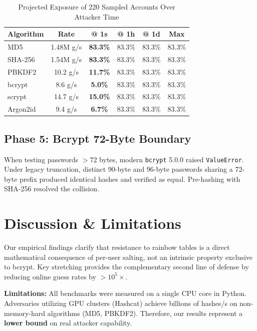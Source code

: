 \documentclass[conference]{IEEEtran}
\begin{document}
\begin{table}[htbp]
\caption{Projected Exposure of 220 Sampled Accounts Over Attacker Time}
\begin{center}
\begin{tabular}{lccccc}
\toprule
\textbf{Algorithm} & \textbf{Rate} & \textbf{@ 1s} & \textbf{@ 1h} & \textbf{@ 1d} & \textbf{Max} \\
\midrule
MD5 & 1.48M g/s & \textbf{83.3\%} & 83.3\% & 83.3\% & 83.3\% \\
SHA-256 & 1.54M g/s & \textbf{83.3\%} & 83.3\% & 83.3\% & 83.3\% \\
PBKDF2 & 10.2 g/s & \textbf{11.7\%} & 83.3\% & 83.3\% & 83.3\% \\
bcrypt & 8.6 g/s & \textbf{5.0\%} & 83.3\% & 83.3\% & 83.3\% \\
scrypt & 14.7 g/s & \textbf{15.0\%} & 83.3\% & 83.3\% & 83.3\% \\
Argon2id & 9.4 g/s & \textbf{6.7\%} & 83.3\% & 83.3\% & 83.3\% \\
\bottomrule
\end{tabular}
\label{tab:exposure}
\end{center}
\end{table}

\subsection{Phase 5: Bcrypt 72-Byte Boundary}
When testing passwords $>72$ bytes, modern \texttt{bcrypt} 5.0.0 raised \texttt{ValueError}. Under legacy truncation, distinct 90-byte and 96-byte passwords sharing a 72-byte prefix produced identical hashes and verified as equal. Pre-hashing with SHA-256 resolved the collision.

\section{Discussion \& Limitations}
Our empirical findings clarify that resistance to rainbow tables is a direct mathematical consequence of per-user salting, not an intrinsic property exclusive to bcrypt. Key stretching provides the complementary second line of defense by reducing online guess rates by $>10^5\times$.

\textbf{Limitations:} All benchmarks were measured on a single CPU core in Python. Adversaries utilizing GPU clusters (Hashcat) achieve billions of hashes/s on non-memory-hard algorithms (MD5, PBKDF2). Therefore, our results represent a \textbf{lower bound} on real attacker capability.
\end{document}
